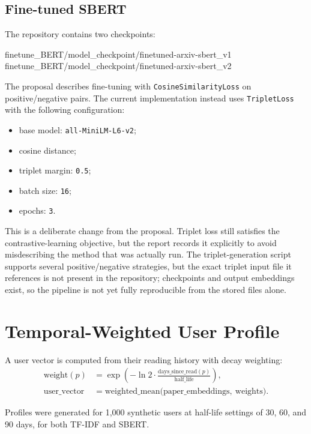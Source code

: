 \documentclass[12pt,a4paper]{article}
\begin{document}
\subsection{Fine-tuned SBERT}
The repository contains two checkpoints:
\begin{center}\ttfamily\small
finetune\_BERT/model\_checkpoint/finetuned-arxiv-sbert\_v1\\
finetune\_BERT/model\_checkpoint/finetuned-arxiv-sbert\_v2
\end{center}

The proposal describes fine-tuning with \texttt{CosineSimilarityLoss} on
positive/negative pairs. The current implementation instead uses
\texttt{TripletLoss} with the following configuration:
\begin{itemize}[leftmargin=1.4em]
  \item base model: \texttt{all-MiniLM-L6-v2};
  \item cosine distance;
  \item triplet margin: \texttt{0.5};
  \item batch size: \texttt{16};
  \item epochs: \texttt{3}.
\end{itemize}
This is a deliberate change from the proposal. Triplet loss still satisfies the
contrastive-learning objective, but the report records it explicitly to avoid
misdescribing the method that was actually run. The triplet-generation script
supports several positive/negative strategies, but the exact triplet input file
it references is not present in the repository; checkpoints and output
embeddings exist, so the pipeline is not yet fully reproducible from the stored
files alone.

\section{Temporal-Weighted User Profile}

A user vector is computed from their reading history with decay weighting:
\begin{align}
\text{weight}(p) &= \exp\!\left(-\ln 2 \cdot \frac{\text{days\_since\_read}(p)}{\text{half\_life}}\right),\\
\text{user\_vector} &= \text{weighted\_mean}\big(\text{paper\_embeddings},\ \text{weights}\big).
\end{align}

Profiles were generated for 1{,}000 synthetic users at half-life settings of
30, 60, and 90 days, for both TF-IDF and SBERT.
\end{document}
